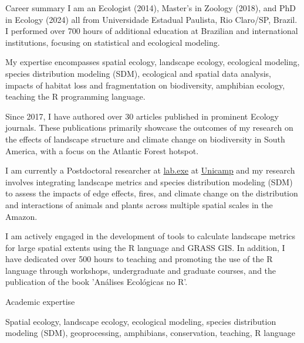 \documentclass{resume}
\begin{document}

\begin{rSection}{Career summary}
I am an Ecologist (2014), Master's in Zoology (2018), and PhD in Ecology (2024) all from Universidade Estadual Paulista, Rio Claro/SP, Brazil. I performed over 700 hours of additional education at Brazilian and international institutions, focusing on statistical and ecological modeling. 

My expertise encompasses spatial ecology, landscape ecology, ecological modeling, species distribution modeling (SDM), ecological and spatial data analysis, impacts of habitat loss and fragmentation on biodiversity, amphibian ecology, teaching the R programming language. 

Since 2017, I have authored over 30 articles published in prominent Ecology journals. These publications primarily showcase the outcomes of my research on the effects of landscape structure and climate change on biodiversity in South America, with a focus on the Atlantic Forest hotspot.

I am currently a Postdoctoral researcher at \href{https://www.mathiasmpires.net.br/index.html}{\underline{lab.exe}} at \href{https://unicamp.br/}{\underline{Unicamp}} and my research involves integrating landscape metrics and species distribution modeling (SDM) to assess the impacts of edge effects, fires, and climate change on the distribution and interactions of animals and plants across multiple spatial scales in the Amazon.

I am actively engaged in the development of tools to calculate landscape metrics for large spatial extents using the R language and GRASS GIS. In addition, I have dedicated over 500 hours to teaching and promoting the use of the R language through workshops, undergraduate and graduate courses, and the publication of the book 'Análises Ecológicas no R'.
\end{rSection}


\begin{rSection}{Academic expertise}

Spatial ecology, landscape ecology, ecological modeling, species distribution modeling (SDM), geoprocessing, amphibians, conservation, teaching, R language

\end{rSection}
\end{document}
